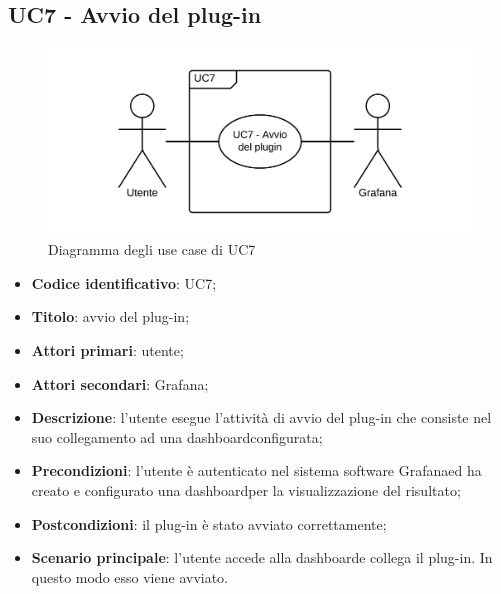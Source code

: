 \subsection{UC7 - Avvio del plug-in}
\begin{figure}[H]
\includegraphics{img/UC7_-_Avvio_plugin.png}
\caption{Diagramma degli use case di UC7}
\end{figure}
\begin{itemize}
	\item \textbf{Codice identificativo}: UC7;
	\item \textbf{Titolo}: avvio del plug-in;
	\item \textbf{Attori primari}: utente;
	\item \textbf{Attori secondari}: Grafana\glo;
	\item \textbf{Descrizione}: l'utente esegue l'attività di avvio del plug-in che consiste nel suo collegamento ad una dashboard\glosp configurata;
	\item \textbf{Precondizioni}: l'utente è autenticato nel sistema software Grafana\glosp ed ha creato e configurato una dashboard\glosp per la visualizzazione del risultato;
	\item \textbf{Postcondizioni}: il plug-in è stato avviato correttamente;
	\item \textbf{Scenario principale}: l'utente accede alla dashboard\glosp e collega il plug-in. In questo modo esso viene avviato.
\end{itemize}
